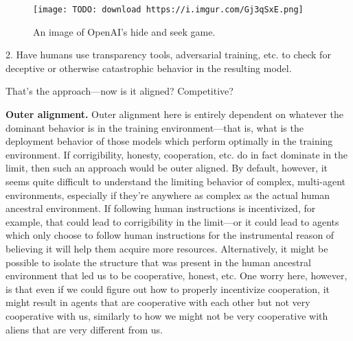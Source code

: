 \begin{figure}[h!]
  \centering
  \texttt{[image: TODO: download https://i.imgur.com/Gj3qSxE.png]}
  \caption{An image of OpenAI's hide and seek game\cite{TODO: cite https://openai.com/blog/emergent-tool-use}.}
\end{figure}

2. Have humans use transparency tools\cite{TODO: cite https://distill.pub/2020/circuits}, adversarial training, etc. to check for deceptive\cite{TODO: cite https://www.alignmentforum.org/posts/zthDPAjh9w6Ytbeks/deceptive-alignment} or otherwise catastrophic\cite{TODO: cite https://ai-alignment.com/learning-with-catastrophes-59387b55cc30} behavior in the resulting model.

That's the approach---now is it aligned? Competitive?

\textbf{Outer alignment.} Outer alignment here is entirely dependent on whatever the dominant behavior is in the training environment---that is, what is the deployment behavior of those models which perform optimally in the training environment. If corrigibility, honesty, cooperation, etc. do in fact dominate in the limit, then such an approach would be outer aligned. By default, however, it seems quite difficult to understand the limiting behavior of complex, multi-agent environments, especially if they're anywhere as complex as the actual human ancestral environment. If following human instructions is incentivized, for example, that could lead to corrigibility in the limit---or it could lead to agents which only choose to follow human instructions for the instrumental reason of believing it will help them acquire more resources. Alternatively, it might be possible to isolate the structure that was present in the human ancestral environment that led us to be cooperative, honest, etc. One worry here, however, is that even if we could figure out how to properly incentivize cooperation, it might result in agents that are cooperative with each other but not very cooperative with us, similarly to how we might not be very cooperative with aliens that are very different from us.

